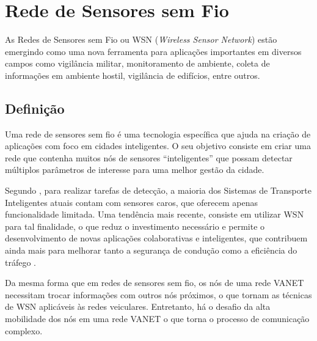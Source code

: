 \documentclass[
	12pt,				%
	oneside,			%
	a4paper,			%
	english,			%
	brazil				%
	]{abntex2ppgsi}
\begin{document}

\chapter{Rede de Sensores sem Fio}

As Redes de Sensores sem Fio ou WSN (\textit{Wireless Sensor Network}) estão emergindo como uma nova ferramenta para aplicações importantes em diversos campos como vigilância militar, monitoramento de ambiente,  coleta de informações em ambiente hostil, vigilância de edifícios, entre outros. 

\section{Definição}
Uma rede de sensores sem fio é uma tecnologia específica que ajuda na criação de aplicações com foco em cidades inteligentes. O seu objetivo consiste em criar uma rede que contenha muitos nós de sensores ``inteligentes'' que possam detectar múltiplos parâmetros de interesse para uma melhor gestão da cidade.

Segundo , para realizar tarefas de detecção, a maioria dos Sistemas de Transporte Inteligentes atuais contam com sensores caros, que oferecem apenas funcionalidade limitada. Uma tendência mais recente, consiste em utilizar WSN para tal finalidade, o que reduz o investimento necessário e permite o desenvolvimento de novas aplicações colaborativas e inteligentes, que contribuem ainda mais para melhorar tanto a segurança de condução como a eficiência do tráfego \cite{losilla2011comprehensive}.

Da mesma forma que em redes de sensores sem fio, os nós de uma rede VANET necessitam trocar informações com outros nós próximos, o que tornam as técnicas de WSN aplicáveis às redes veiculares. Entretanto, há o desafio da alta mobilidade dos nós em uma rede VANET o que torna o processo de comunicação complexo.
\end{document}
